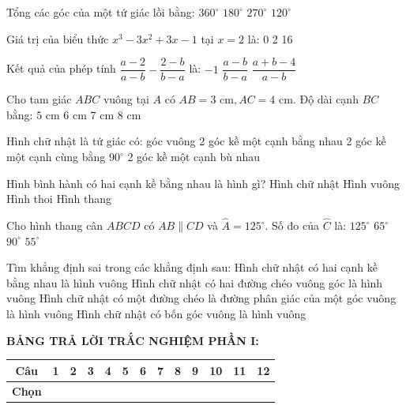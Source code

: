 \documentclass[12pt,a4paper]{article}
\begin{document}
\begin{ex}
Tổng các góc của một tứ giác lồi bằng:
\choice
{\True $360^\circ$}
{$180^\circ$}
{$270^\circ$}
{$120^\circ$}
\end{ex}

\begin{ex}
Giá trị của biểu thức $x^3 - 3x^2 + 3x - 1$ tại $x = 2$ là:
\choice
{0}
{}
{2}
{16}
\end{ex}

\begin{ex}
Kết quả của phép tính $\dfrac{a - 2}{a - b} - \dfrac{2 - b}{b - a}$ là:
\choice
{$-1$}
{}
{$\dfrac{a - b}{b - a}$}
{$\dfrac{a + b - 4}{a - b}$}
\end{ex}

\begin{ex}
Cho tam giác $ABC$ vuông tại $A$ có $AB = 3\text{ cm}, AC = 4\text{ cm}$. Độ dài cạnh $BC$ bằng:
\choice
{\True $5\text{ cm}$}
{$6\text{ cm}$}
{$7\text{ cm}$}
{$8\text{ cm}$}
\end{ex}

\begin{ex}
Hình chữ nhật là tứ giác có:
\choice
{ góc vuông}
{2 góc kề một cạnh bằng nhau}
{2 góc kề một cạnh cùng bằng $90^\circ$}
{2 góc kề một cạnh bù nhau}
\end{ex}

\begin{ex}
Hình bình hành có hai cạnh kề bằng nhau là hình gì?
\choice
{Hình chữ nhật}
{Hình vuông}
{\True Hình thoi}
{Hình thang}
\end{ex}

\begin{ex}
Cho hình thang cân $ABCD$ có $AB \parallel CD$ và $\widehat{A} = 125^\circ$. Số đo của $\widehat{C}$ là:
\choice
{$125^\circ$}
{$65^\circ$}
{$90^\circ$}
{\True $55^\circ$}
\end{ex}

\begin{ex}
Tìm khẳng định sai trong các khẳng định sau:
\choice
{Hình chữ nhật có hai cạnh kề bằng nhau là hình vuông}
{Hình chữ nhật có hai đường chéo vuông góc là hình vuông}
{Hình chữ nhật có một đường chéo là đường phân giác của một góc vuông là hình vuông}
{\True Hình chữ nhật có bốn góc vuông là hình vuông}
\end{ex}


\vspace{1mm}
\noindent\textbf{BẢNG TRẢ LỜI TRẮC NGHIỆM PHẦN I:}
\begin{center}
\begin{tabular}{|c|c|c|c|c|c|c|c|c|c|c|c|c|}
\hline
\textbf{Câu} & \textbf{1} & \textbf{2} & \textbf{3} & \textbf{4} & \textbf{5} & \textbf{6} & \textbf{7} & \textbf{8} & \textbf{9} & \textbf{10} & \textbf{11} & \textbf{12} \\
\hline
\textbf{Chọn} & \rule{0pt}{0.65cm} & & & & & & & & & & & \\
\hline
\end{tabular}
\end{center}
\vspace{2mm}
\end{document}
